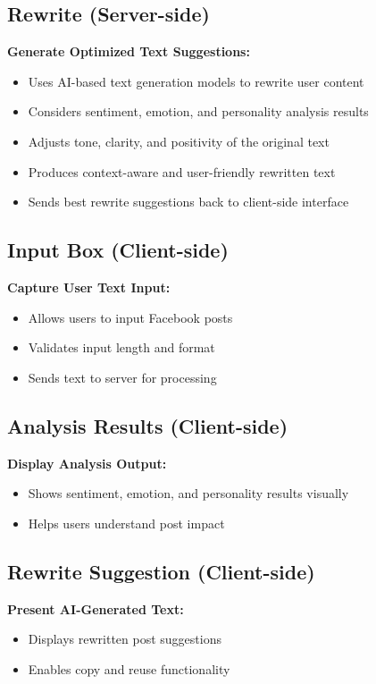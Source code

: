 \documentclass[12pt,a4paper]{report}
\begin{document}
\begin{itemize}
\subsection{Rewrite (Server-side)}

\textbf{Generate Optimized Text Suggestions:}
\begin{itemize}
    \item Uses AI-based text generation models to rewrite user content
    \item Considers sentiment, emotion, and personality analysis results
    \item Adjusts tone, clarity, and positivity of the original text
    \item Produces context-aware and user-friendly rewritten text
    \item Sends best rewrite suggestions back to client-side interface
\end{itemize}

\subsection{Input Box (Client-side)}

\textbf{Capture User Text Input:}
\begin{itemize}
    \item Allows users to input Facebook posts
    \item Validates input length and format
    \item Sends text to server for processing
\end{itemize}

\subsection{Analysis Results (Client-side)}

\textbf{Display Analysis Output:}
\begin{itemize}
    \item Shows sentiment, emotion, and personality results visually
    \item Helps users understand post impact
\end{itemize}

\subsection {Rewrite Suggestion (Client-side)}

\textbf{Present AI-Generated Text:}
\begin{itemize}
    \item Displays rewritten post suggestions
    \item Enables copy and reuse functionality
\end{itemize}







\end{itemize}
\end{document}
